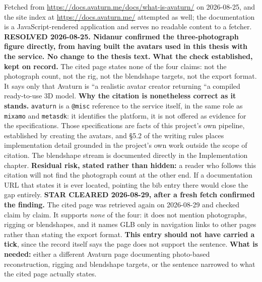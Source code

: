 \documentclass[11pt, a4paper]{article}
\begin{document}
\begin{Form}
  {Fetched from \url{https://docs.avaturn.me/docs/what-is-avaturn/} on 2026-08-25, and the site index at \url{https://docs.avaturn.me/} attempted as well; the documentation is a JavaScript-rendered application and serves no readable content to a fetcher. \textbf{RESOLVED 2026-08-25. Nidanur confirmed the three-photograph figure directly, from having built the avatars used in this thesis with the service. No change to the thesis text.} \textbf{What the check established, kept on record.} The cited page states none of the four claims: not the photograph count, not the rig, not the blendshape targets, not the export format. It says only that Avaturn is ``a realistic avatar creator returning ``a compiled ready-to-use 3D model. \textbf{Why the citation is nonetheless correct as it stands.} \texttt{avaturn} is a \texttt{@misc} reference to the service itself, in the same role as \texttt{mixamo} and \texttt{metasdk}: it identifies the platform, it is not offered as evidence for the specifications. Those specifications are facts of this project's own pipeline, established by creating the avatars, and \S5.2 of the writing rules places implementation detail grounded in the project's own work outside the scope of citation. The blendshape stream is documented directly in the Implementation chapter. \textbf{Residual risk, stated rather than hidden:} a reader who follows this citation will not find the photograph count at the other end. If a documentation URL that states it is ever located, pointing the bib entry there would close the gap entirely. \textbf{STAR CLEARED 2026-08-29, after a fresh fetch confirmed the finding.} The cited page was retrieved again on 2026-08-29 and checked claim by claim. It supports \emph{none} of the four: it does not mention photographs, rigging or blendshapes, and it names GLB only in navigation links to other pages rather than stating the export format. \textbf{This entry should not have carried a tick}, since the record itself says the page does not support the sentence. \textbf{What is needed:} either a different Avaturn page documenting photo-based reconstruction, rigging and blendshape targets, or the sentence narrowed to what the cited page actually states.}



\end{Form}
\end{document}
